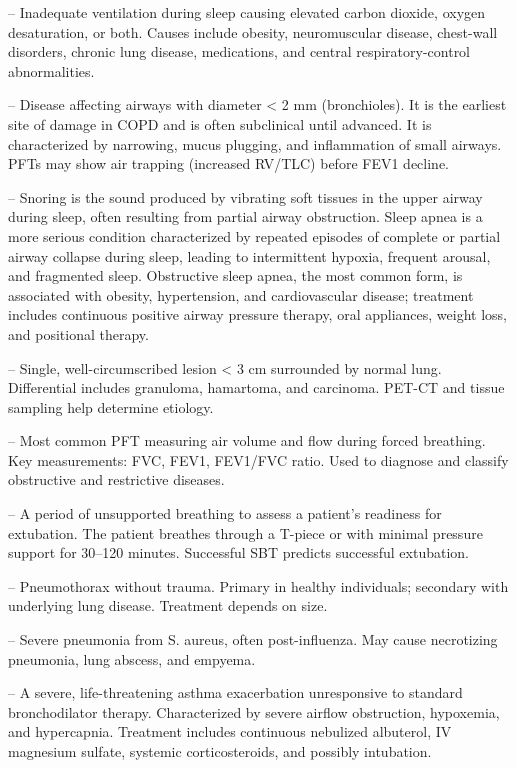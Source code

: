 -- Inadequate ventilation during sleep causing elevated carbon dioxide, oxygen desaturation, or both. Causes include obesity, neuromuscular disease, chest-wall disorders, chronic lung disease, medications, and central respiratory-control abnormalities.

-- Disease affecting airways with diameter < 2 mm (bronchioles). It is the earliest site of damage in COPD and is often subclinical until advanced. It is characterized by narrowing, mucus plugging, and inflammation of small airways. PFTs may show air trapping (increased RV/TLC) before FEV1 decline.

-- Snoring is the sound produced by vibrating soft tissues in the upper airway during sleep, often resulting from partial airway obstruction. Sleep apnea is a more serious condition characterized by repeated episodes of complete or partial airway collapse during sleep, leading to intermittent hypoxia, frequent arousal, and fragmented sleep. Obstructive sleep apnea, the most common form, is associated with obesity, hypertension, and cardiovascular disease; treatment includes continuous positive airway pressure therapy, oral appliances, weight loss, and positional therapy.

-- Single, well-circumscribed lesion < 3 cm surrounded by normal lung. Differential includes granuloma, hamartoma, and carcinoma. PET-CT and tissue sampling help determine etiology.

-- Most common PFT measuring air volume and flow during forced breathing. Key measurements: FVC, FEV1, FEV1/FVC ratio. Used to diagnose and classify obstructive and restrictive diseases.

-- A period of unsupported breathing to assess a patient's readiness for extubation. The patient breathes through a T-piece or with minimal pressure support for 30--120 minutes. Successful SBT predicts successful extubation.

-- Pneumothorax without trauma. Primary in healthy individuals; secondary with underlying lung disease. Treatment depends on size.

-- Severe pneumonia from S. aureus, often post-influenza. May cause necrotizing pneumonia, lung abscess, and empyema.

-- A severe, life-threatening asthma exacerbation unresponsive to standard bronchodilator therapy. Characterized by severe airflow obstruction, hypoxemia, and hypercapnia. Treatment includes continuous nebulized albuterol, IV magnesium sulfate, systemic corticosteroids, and possibly intubation.

